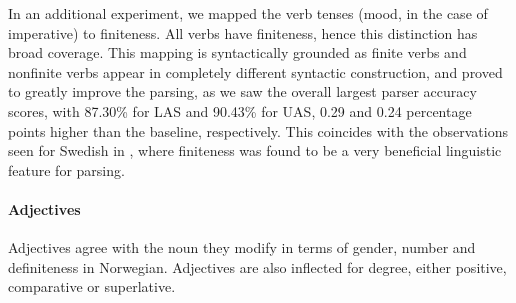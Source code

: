 \documentclass[11pt,a4paper]{article}
\begin{document}
In an additional experiment, we mapped the verb tenses (mood, in the case of
imperative) to finiteness.  All verbs have finiteness, hence this distinction
has broad coverage.  This mapping is syntactically grounded as finite verbs and
nonfinite verbs appear in completely different syntactic construction, and
proved to greatly improve the parsing, as we saw the overall largest parser
accuracy scores, with 87.30\% for LAS and 90.43\% for UAS, 0.29 and 0.24
percentage points higher than the baseline, respectively. This coincides with
the observations seen for Swedish in , where finiteness was found
to be a very beneficial linguistic feature for parsing.


\paragraph{Adjectives}
Adjectives agree with the noun they modify in terms of gender, number and
definiteness in Norwegian. Adjectives are also inflected for degree, either
positive, comparative or superlative.
\end{document}
